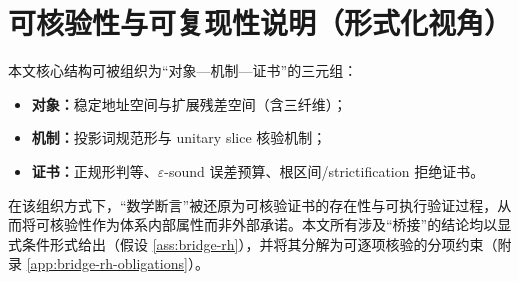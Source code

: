\section{可核验性与可复现性说明（形式化视角）}\label{app:audit}

本文核心结构可被组织为“对象—机制—证书”的三元组：
\begin{itemize}
  \item \textbf{对象：}稳定地址空间与扩展残差空间（含三纤维）；
  \item \textbf{机制：}投影词规范形与 unitary slice 核验机制；
  \item \textbf{证书：}正规形判等、$\varepsilon$-sound 误差预算、根区间/strictification 拒绝证书。
\end{itemize}
在该组织方式下，“数学断言”被还原为可核验证书的存在性与可执行验证过程，从而将可核验性作为体系内部属性而非外部承诺。本文所有涉及“桥接”的结论均以显式条件形式给出（假设 \ref{ass:bridge-rh}），并将其分解为可逐项核验的分项约束（附录 \ref{app:bridge-rh-obligations}）。

